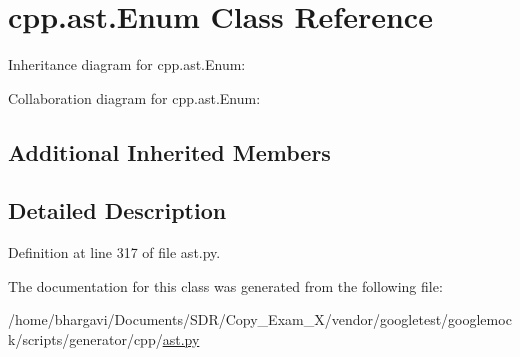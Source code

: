 \hypertarget{classcpp_1_1ast_1_1_enum}{}\section{cpp.\+ast.\+Enum Class Reference}
\label{classcpp_1_1ast_1_1_enum}


Inheritance diagram for cpp.\+ast.\+Enum\+:


Collaboration diagram for cpp.\+ast.\+Enum\+:
\subsection*{Additional Inherited Members}


\subsection{Detailed Description}


Definition at line 317 of file ast.\+py.



The documentation for this class was generated from the following file\+:\begin{DoxyCompactItemize}
\item 
/home/bhargavi/\+Documents/\+S\+D\+R/\+Copy\+\_\+\+Exam\+\_\+X/vendor/googletest/googlemock/scripts/generator/cpp/\hyperlink{ast_8py}{ast.\+py}\end{DoxyCompactItemize}

